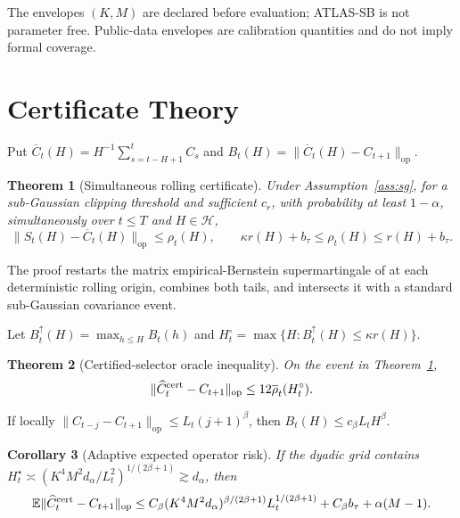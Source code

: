 \documentclass{article}
\newtheorem{theorem}{Theorem}
\newtheorem{corollary}[theorem]{Corollary}
\theoremstyle{definition}
\theoremstyle{remark}
\newcommand{\E}{\mathbb E}
\newcommand{\Hh}{\mathcal H}
\newcommand{\op}{\mathrm{op}}
\begin{document}
The envelopes $(K,M)$ are declared before evaluation; ATLAS-SB is not parameter free.  Public-data envelopes are calibration quantities and do not imply formal coverage.

\section{Certificate Theory}
\label{sec:theory}

Put $\overline C_t(H)=H^{-1}\sum_{s=t-H+1}^tC_s$ and
$B_t(H)=\|\overline C_t(H)-C_{t+1}\|_{\op}$.

\begin{theorem}[Simultaneous rolling certificate]
\label{thm:certificate}
Under Assumption~\ref{ass:sg}, for a sub-Gaussian clipping threshold and sufficient $c_r$, with probability at least $1-\alpha$, simultaneously over $t\le T$ and $H\in\Hh$,
\begin{equation}
 \|S_t(H)-\overline C_t(H)\|_{\op}\le\rho_t(H),\qquad
 \kappa r(H)+b_\tau\le\rho_t(H)\le r(H)+b_\tau.
 \label{eq:certificate}
\end{equation}
\end{theorem}

The proof restarts the matrix empirical-Bernstein supermartingale of \citet{wang2024matrixeb} at each deterministic rolling origin, combines both tails, and intersects it with a standard sub-Gaussian covariance event.

Let $B_t^\uparrow(H)=\max_{h\le H}B_t(h)$ and
$H_t^\circ=\max\{H:B_t^\uparrow(H)\le\kappa r(H)\}$.

\begin{theorem}[Certified-selector oracle inequality]
\label{thm:oracle}
On the event in Theorem~\ref{thm:certificate},
\begin{equation}
 \|\widehat C_t^{\rm cert}-C_{t+1}\|_{\op}
 \le12\overline\rho_t(H_t^\circ).
 \label{eq:oracle}
\end{equation}
\end{theorem}

If locally
$\|C_{t-j}-C_{t+1}\|_{\op}\le L_t(j+1)^\beta$, then $B_t(H)\le c_\beta L_tH^\beta$.

\begin{corollary}[Adaptive expected operator risk]
\label{cor:rate}
If the dyadic grid contains
$H_t^\star\asymp(K^4M^2d_\alpha/L_t^2)^{1/(2\beta+1)}\gtrsim d_\alpha$, then
\begin{equation}
 \E\|\widehat C_t^{\rm cert}-C_{t+1}\|_{\op}
 \le C_\beta(K^4M^2d_\alpha)^{\beta/(2\beta+1)}L_t^{1/(2\beta+1)}
 +C_\beta b_\tau+\alpha(M-1).
 \label{eq:upper-rate}
\end{equation}
\end{corollary}
\end{document}
